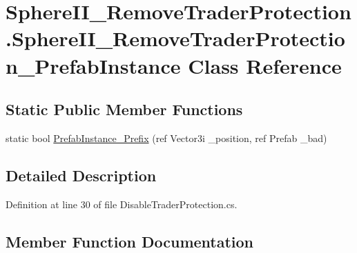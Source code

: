 \hypertarget{class_sphere_i_i___remove_trader_protection_1_1_sphere_i_i___remove_trader_protection___prefab_instance}{}\section{Sphere\+I\+I\+\_\+\+Remove\+Trader\+Protection.\+Sphere\+I\+I\+\_\+\+Remove\+Trader\+Protection\+\_\+\+Prefab\+Instance Class Reference}
\label{class_sphere_i_i___remove_trader_protection_1_1_sphere_i_i___remove_trader_protection___prefab_instance}
\subsection*{Static Public Member Functions}
\begin{DoxyCompactItemize}
\item 
static bool \mbox{\hyperlink{class_sphere_i_i___remove_trader_protection_1_1_sphere_i_i___remove_trader_protection___prefab_instance_a5910ae4b78c568f844e64b31141ae9be}{Prefab\+Instance\+\_\+\+Prefix}} (ref Vector3i \+\_\+position, ref Prefab \+\_\+bad)
\end{DoxyCompactItemize}


\subsection{Detailed Description}


Definition at line 30 of file Disable\+Trader\+Protection.\+cs.



\subsection{Member Function Documentation}
\mbox{\label{class_sphere_i_i___remove_trader_protection_1_1_sphere_i_i___remove_trader_protection___prefab_instance_a5910ae4b78c568f844e64b31141ae9be}} 
